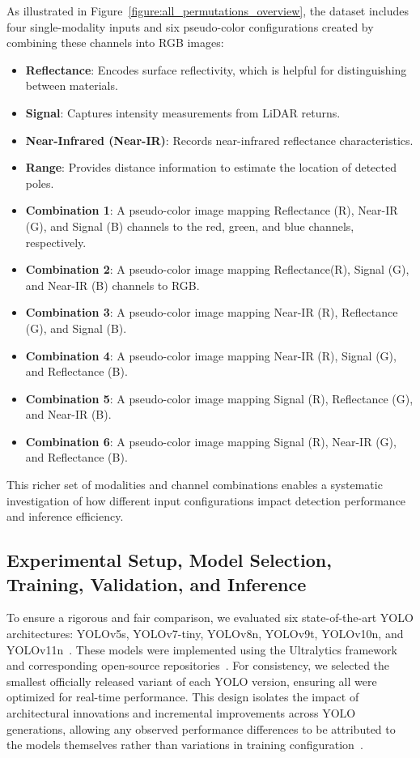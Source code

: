\documentclass[runningheads]{llncs}
\begin{document}
As illustrated in Figure~\ref{figure:all_permutations_overview}, the dataset includes four single-modality inputs and six pseudo-color configurations created by combining these channels into RGB images:

\begin{itemize}
    \item \textbf{Reflectance}: Encodes surface reflectivity, which is helpful for distinguishing between materials.
    \item \textbf{Signal}: Captures intensity measurements from LiDAR returns.
    \item \textbf{Near-Infrared (Near-IR)}: Records near-infrared reflectance characteristics.
    \item \textbf{Range}: Provides distance information to estimate the location of detected poles.
    \item \textbf{Combination 1}: A pseudo-color image mapping Reflectance (R), Near-IR (G), and Signal (B) channels to the red, green, and blue channels, respectively.
    \item \textbf{Combination 2}: A pseudo-color image mapping  Reflectance(R), Signal (G), and Near-IR (B) channels to RGB.
    \item \textbf{Combination 3}: A pseudo-color image mapping Near-IR (R), Reflectance (G), and Signal (B).
    \item \textbf{Combination 4}: A pseudo-color image mapping Near-IR (R), Signal (G), and Reflectance (B).
    \item \textbf{Combination 5}: A pseudo-color image mapping Signal (R), Reflectance (G), and Near-IR (B).
    \item \textbf{Combination 6}: A pseudo-color image mapping Signal (R), Near-IR (G), and Reflectance (B).
\end{itemize}

This richer set of modalities and channel combinations enables a systematic investigation of how different input configurations impact detection performance and inference efficiency.



\subsection{Experimental Setup, Model Selection, Training, Validation, and Inference}

To ensure a rigorous and fair comparison, we evaluated six state-of-the-art YOLO architectures: YOLOv5s, YOLOv7-tiny, YOLOv8n, YOLOv9t, YOLOv10n, and YOLOv11n~\cite{ultralytics2025yolov5,wang2023yolov7,wang2024yolov9,jegham2023comprehensive}. These models were implemented using the Ultralytics framework and corresponding open-source repositories~\cite{ultralytics2025docs,ultralytics2024benchmark,ultralytics2024blog}. For consistency, we selected the smallest officially released variant of each YOLO version, ensuring all were optimized for real-time performance. This design isolates the impact of architectural innovations and incremental improvements across YOLO generations, allowing any observed performance differences to be attributed to the models themselves rather than variations in training configuration~\cite{ultralytics2024yolo11,jegham2025yolo}.
\end{document}
